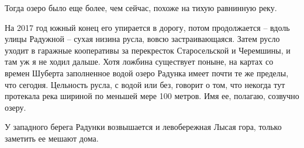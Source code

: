 Тогда озеро было еще более, чем сейчас, похоже на тихую равнинную реку.

На 2017 год южный конец его упирается в дорогу, потом продолжается – вдоль улицы Радужной – сухая низина русла, вовсю застраивающаяся. Затем русло уходит в гаражные кооперативы за перекресток Старосельской и Черемшины, и там уж я не ходил дальше. Хотя ложбина существует поныне, на картах со времен Шуберта заполненное водой озеро Радунка имеет почти те же пределы, что сегодня. Цельность русла, с водой или без, говорит о том, что некогда тут протекала река шириной по меньшей мере 100 метров. Имя ее, полагаю, созвучно озеру.


У западного берега Радунки возвышается и левобережная Лысая гора, только заметить ее мешают дома.
